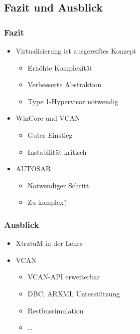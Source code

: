 \documentclass[]{beamer}
\begin{document}
\subsection{Fazit und Ausblick}
\begin{frame}
\frametitle{Fazit}
    \begin{itemize}
        \item Virtualisierung ist ausgereiftes Konzept
        \begin{itemize}
            \item Erhöhte Komplexität
            \item Verbesserte Abstraktion
            \item Type 1-Hypervisor notwendig
        \end{itemize}
        \item WinCore und VCAN
        \begin{itemize}
            \item Guter Einstieg
            \item Instabilität kritisch
        \end{itemize}
        \item AUTOSAR
        \begin{itemize}
            \item Notwendiger Schritt
            \item Zu komplex?
        \end{itemize}
    \end{itemize}
\end{frame}


\begin{frame}
\frametitle{Ausblick}
    \begin{itemize}
        \item XtratuM in der Lehre
        \item VCAN
        \begin{itemize}
            \item VCAN-API erweiterbar
            \item DBC, ARXML Unterstützung
            \item Restbussimulation
            \item \dots
        \end{itemize}
    \end{itemize}
\end{frame}
\end{document}
